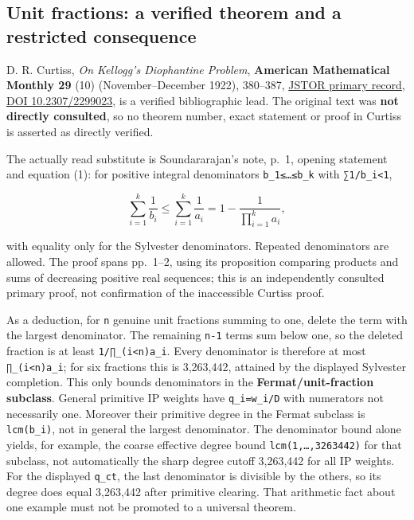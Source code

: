 \documentclass[11pt,a4paper,oneside]{report}
\begin{document}
\subsection{Unit fractions: a verified theorem and a restricted
consequence}\label{weight-enumeration-and-degree-bounds--unit-fractions-a-verified-theorem-and-a-restricted-consequence}

D. R. Curtiss, \emph{On Kellogg's Diophantine Problem}, \textbf{American
Mathematical Monthly 29} (10) (November--December 1922), 380--387,
\href{https://www.jstor.org/stable/2299023}{JSTOR primary record},
\href{https://doi.org/10.2307/2299023}{DOI
10.\allowbreak{}2307/\allowbreak{}2299023}, is a verified bibliographic
lead. The original text was \textbf{not directly consulted}, so no
theorem number, exact statement or proof in Curtiss is asserted as
directly verified.

The actually read substitute is Soundararajan's note, p.~1, opening
statement and equation (1): for positive integral denominators
\texttt{b\_\allowbreak{}1≤…≤b\_\allowbreak{}k} with
\texttt{∑1/\allowbreak{}b\_\allowbreak{}i<1},

\[
\sum_{i=1}^k\frac1{b_i}\le\sum_{i=1}^k\frac1{a_i}
=1-\frac1{\prod_{i=1}^k a_i},
\]

with equality only for the Sylvester denominators. Repeated denominators
are allowed. The proof spans pp.~1--2, using its proposition comparing
products and sums of decreasing positive real sequences; this is an
independently consulted primary proof, not confirmation of the
inaccessible Curtiss proof.

As a deduction, for \texttt{n} genuine unit fractions summing to one,
delete the term with the largest denominator. The remaining
\texttt{n-\allowbreak{}1} terms sum below one, so the deleted fraction
is at least
\texttt{1/\allowbreak{}∏\_\allowbreak{}(\allowbreak{}i<n)\allowbreak{}a\_\allowbreak{}i}.
Every denominator is therefore at most
\texttt{∏\_\allowbreak{}(\allowbreak{}i<n)\allowbreak{}a\_\allowbreak{}i};
for six fractions this is 3,263,442, attained by the displayed Sylvester
completion. This only bounds denominators in the
\textbf{Fermat/unit-fraction subclass}. General primitive IP weights
have
\texttt{q\_\allowbreak{}i=\allowbreak{}w\_\allowbreak{}i/\allowbreak{}D}
with numerators not necessarily one. Moreover their primitive degree in
the Fermat subclass is \texttt{lcm(\allowbreak{}b\_\allowbreak{}i)}, not
in general the largest denominator. The denominator bound alone yields,
for example, the coarse effective degree bound
\texttt{lcm(\allowbreak{}1,\allowbreak{}…,\allowbreak{}3263442)} for
that subclass, not automatically the sharp degree cutoff 3,263,442 for
all IP weights. For the displayed \texttt{q\_\allowbreak{}ct}, the last
denominator is divisible by the others, so its degree does equal
3,263,442 after primitive clearing. That arithmetic fact about one
example must not be promoted to a universal theorem.
\end{document}
